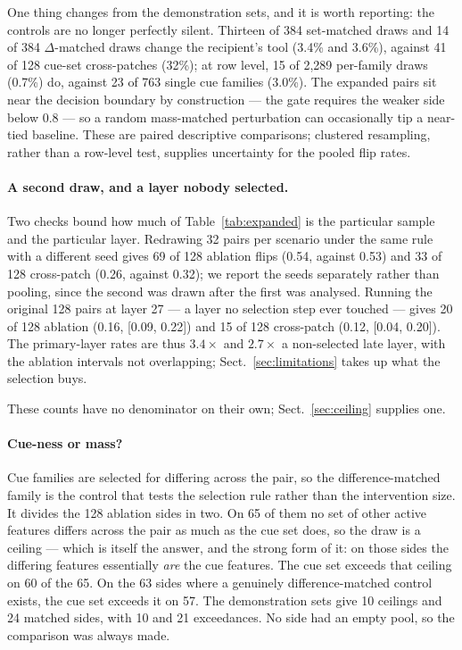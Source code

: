 \documentclass{article}
\begin{document}
One thing changes from the demonstration sets, and it is worth reporting: the controls are no longer perfectly silent. Thirteen of 384 set-matched draws and 14 of 384 $\Delta$-matched draws change the recipient's tool (3.4\% and 3.6\%), against 41 of 128 cue-set cross-patches (32\%); at row level, 15 of 2{,}289 per-family draws (0.7\%) do, against 23 of 763 single cue families (3.0\%). The expanded pairs sit near the decision boundary by construction --- the gate requires the weaker side below 0.8 --- so a random mass-matched perturbation can occasionally tip a near-tied baseline. These are paired descriptive comparisons; clustered resampling, rather than a row-level test, supplies uncertainty for the pooled flip rates.

\paragraph{A second draw, and a layer nobody selected.} Two checks bound how much of Table~\ref{tab:expanded} is the particular sample and the particular layer. Redrawing 32 pairs per scenario under the same rule with a different seed gives 69 of 128 ablation flips (0.54, against 0.53) and 33 of 128 cross-patch (0.26, against 0.32); we report the seeds separately rather than pooling, since the second was drawn after the first was analysed. Running the original 128 pairs at layer 27 --- a layer no selection step ever touched --- gives 20 of 128 ablation (0.16, [0.09, 0.22]) and 15 of 128 cross-patch (0.12, [0.04, 0.20]). The primary-layer rates are thus $3.4\times$ and $2.7\times$ a non-selected late layer, with the ablation intervals not overlapping; Sect.~\ref{sec:limitations} takes up what the selection buys.

These counts have no denominator on their own; Sect.~\ref{sec:ceiling} supplies one.

\paragraph{Cue-ness or mass?} Cue families are selected for differing across the pair, so the difference-matched family is the control that tests the selection rule rather than the intervention size. It divides the 128 ablation sides in two. On 65 of them no set of other active features differs across the pair as much as the cue set does, so the draw is a ceiling --- which is itself the answer, and the strong form of it: on those sides the differing features essentially \emph{are} the cue features. The cue set exceeds that ceiling on 60 of the 65. On the 63 sides where a genuinely difference-matched control exists, the cue set exceeds it on 57. The demonstration sets give 10 ceilings and 24 matched sides, with 10 and 21 exceedances. No side had an empty pool, so the comparison was always made.
\end{document}
